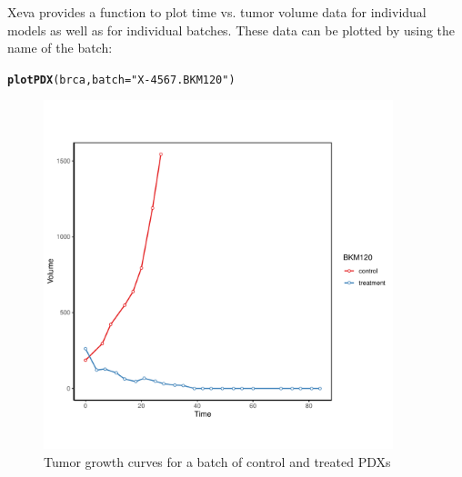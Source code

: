 \documentclass{article}\usepackage[]{graphicx}\usepackage[]{xcolor}
\makeatletter
\newcommand{\hlstr}[1]{\textcolor[rgb]{0.192,0.494,0.8}{#1}}%
\newcommand{\hlstd}[1]{\textcolor[rgb]{0.345,0.345,0.345}{#1}}%
\newcommand{\hlkwc}[1]{\textcolor[rgb]{0.333,0.667,0.333}{#1}}%
\newcommand{\hlkwd}[1]{\textcolor[rgb]{0.737,0.353,0.396}{\textbf{#1}}}%
\newenvironment{kframe}{%
 \def\at@end@of@kframe{}%
 \ifinner\ifhmode%
  \def\at@end@of@kframe{\end{minipage}}%
  \begin{minipage}{\columnwidth}%
 \fi\fi%
 \def\FrameCommand##1{\hskip\@totalleftmargin \hskip-\fboxsep
 \colorbox{shadecolor}{##1}\hskip-\fboxsep
     \hskip-\linewidth \hskip-\@totalleftmargin \hskip\columnwidth}%
 \MakeFramed {\advance\hsize-\width
   \@totalleftmargin\z@ \linewidth\hsize
   \@setminipage}}%
 {\par\unskip\endMakeFramed%
 \at@end@of@kframe}
\newenvironment{knitrout}{}{} %
\makeatother
\begin{document}
Xeva provides a function to plot time vs. tumor volume data for individual models as well as for individual batches. These data can be plotted by using the name of the batch:
\begin{knitrout}
\color{fgcolor}\begin{kframe}
\begin{alltt}
\hlkwd{plotPDX}\hlstd{(brca,} \hlkwc{batch} \hlstd{=} \hlstr{"X-4567.BKM120"}\hlstd{)}
\end{alltt}
\end{kframe}\begin{figure}
\includegraphics[width=4in]{figure/plot1-1} \caption[Tumor growth curves for a batch of control and treated PDXs]{Tumor growth curves for a batch of control and treated PDXs}\label{fig:plot1}
\end{figure}

\end{knitrout}
\end{document}
